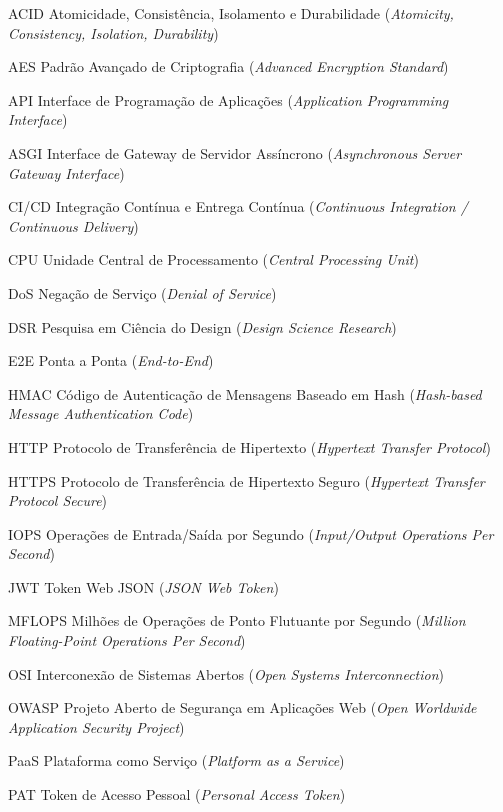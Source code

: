 \documentclass[
    12pt,               %
    oneside,            %
    a4paper,            %
    chapter=TITLE,      %
    section=TITLE,      %
    english,            %
    brazil,             %
    article             %
]{abntex2}
\begin{document}
\begin{siglas}
    \item[ACID] Atomicidade, Consistência, Isolamento e Durabilidade (\textit{Atomicity, Consistency, Isolation, Durability})
    \item[AES] Padrão Avançado de Criptografia (\textit{Advanced Encryption Standard})
    \item[API] Interface de Programação de Aplicações (\textit{Application Programming Interface})
    \item[ASGI] Interface de Gateway de Servidor Assíncrono (\textit{Asynchronous Server Gateway Interface})
    \item[CI/CD] Integração Contínua e Entrega Contínua (\textit{Continuous Integration / Continuous Delivery})
    \item[CPU] Unidade Central de Processamento (\textit{Central Processing Unit})
    \item[DoS] Negação de Serviço (\textit{Denial of Service})
    \item[DSR] Pesquisa em Ciência do Design (\textit{Design Science Research})
    \item[E2E] Ponta a Ponta (\textit{End-to-End})
    \item[HMAC] Código de Autenticação de Mensagens Baseado em Hash (\textit{Hash-based Message Authentication Code})
    \item[HTTP] Protocolo de Transferência de Hipertexto (\textit{Hypertext Transfer Protocol})
    \item[HTTPS] Protocolo de Transferência de Hipertexto Seguro (\textit{Hypertext Transfer Protocol Secure})
    \item[IOPS] Operações de Entrada/Saída por Segundo (\textit{Input/Output Operations Per Second})
    \item[JWT] Token Web JSON (\textit{JSON Web Token})
    \item[MFLOPS] Milhões de Operações de Ponto Flutuante por Segundo (\textit{Million Floating-Point Operations Per Second})
    \item[OSI] Interconexão de Sistemas Abertos (\textit{Open Systems Interconnection})
    \item[OWASP] Projeto Aberto de Segurança em Aplicações Web (\textit{Open Worldwide Application Security Project})
    \item[PaaS] Plataforma como Serviço (\textit{Platform as a Service})
    \item[PAT] Token de Acesso Pessoal (\textit{Personal Access Token})

\end{siglas}
\end{document}
